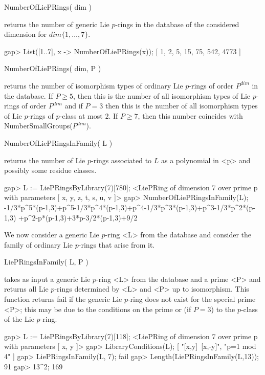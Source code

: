 
\> NumberOfLiePRings( dim )

returns the number of generic Lie $p$-rings in the database of the
considered dimension for $dim \{ 1, \ldots, 7\}$.

\beginexample
gap> List([1..7], x -> NumberOfLiePRings(x));
[ 1, 2, 5, 15, 75, 542, 4773 ]
\endexample

\> NumberOfLiePRings( dim, P )

returns the number of isomorphism types of ordinary Lie $p$-rings of order
$P^{dim}$ in the database. If $P \geq 5$, then this is the number of all
isomorphism types of Lie $p$-rings of order $P^{dim}$ and if $P = 3$ then
this is the number of all isomorphism types of Lie $p$-rings of $p$-class
at most $2$. If $P \geq 7$, then this number coincides with
NumberSmallGroups($P^{dim}$).

\> NumberOfLiePRingsInFamily( L )

returns the number of Lie $p$-rings associated to $L$ as a polynomial in
<p> and possibly some residue classes.

\beginexample
gap> L := LiePRingsByLibrary(7)[780];
<LiePRing of dimension 7 over prime p with parameters
[ x, y, z, t, s, u, v ]>
gap> NumberOfLiePRingsInFamily(L);
-1/3*p^5*(p-1,3)+p^5-1/3*p^4*(p-1,3)+p^4-1/3*p^3*(p-1,3)+p^3-1/3*p^2*(p-1,3)
+p^2-p*(p-1,3)+3*p-3/2*(p-1,3)+9/2
\endexample


We now consider a generic Lie $p$-ring <L> from the database and consider
the family of ordinary Lie $p$-rings that arise from it.

\> LiePRingsInFamily( L, P )

takes as input a generic Lie $p$-ring <L> from the database and a prime <P> 
and returns all Lie $p$-rings determined by <L> and <P> up to isomorphism. 
This function returns fail if the generic Lie $p$-ring does not exist for 
the special prime <P>; this may be due to the conditions on the prime or
(if $P=3$) to the $p$-class of the Lie $p$-ring. 

\beginexample
gap> L := LiePRingsByLibrary(7)[118];
<LiePRing of dimension 7 over prime p with parameters [ x, y ]>
gap> LibraryConditions(L);
[ "[x,y]~[x,-y]", "p=1 mod 4" ]
gap> LiePRingsInFamily(L, 7);
fail
gap> Length(LiePRingsInFamily(L,13));
91
gap> 13^2;
169
\endexample

